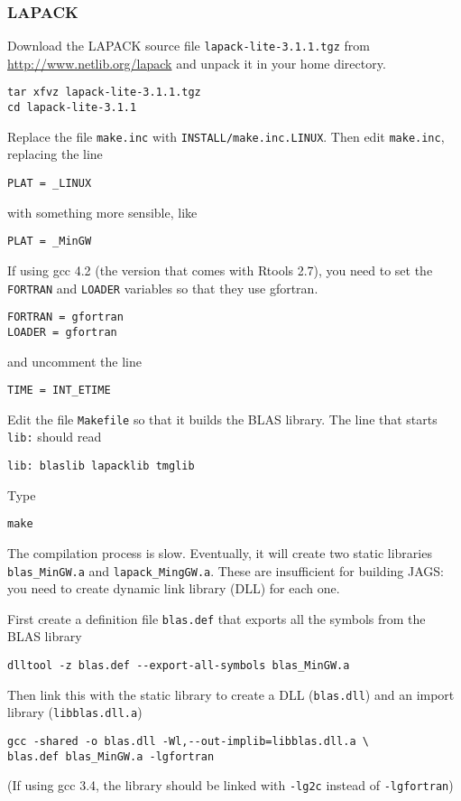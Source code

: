 \documentclass[11pt, a4paper, titlepage]{report}
\newcommand{\JAGS}{\textsf{JAGS}}
\begin{document}
\subsubsection*{LAPACK}

Download the LAPACK source file \verb+lapack-lite-3.1.1.tgz+ from
\url{http://www.netlib.org/lapack} and unpack it in your home
directory.
\begin{verbatim}
tar xfvz lapack-lite-3.1.1.tgz
cd lapack-lite-3.1.1
\end{verbatim}
Replace the file \texttt{make.inc} with
\texttt{INSTALL/make.inc.LINUX}.  Then edit \texttt{make.inc},
replacing the line
\begin{verbatim}
PLAT = _LINUX
\end{verbatim}
with something more sensible, like
\begin{verbatim}
PLAT = _MinGW
\end{verbatim} 
If using gcc 4.2 (the version that comes with Rtools 2.7), you need
to set the \verb+FORTRAN+ and \verb+LOADER+ variables so that they use
gfortran.
\begin{verbatim}
FORTRAN = gfortran
LOADER = gfortran
\end{verbatim}
and uncomment the line
\begin{verbatim}
TIME = INT_ETIME
\end{verbatim}

Edit the file \texttt{Makefile} so that it builds the BLAS library. The
line that starts \texttt{lib:} should read
\begin{verbatim}
lib: blaslib lapacklib tmglib
\end{verbatim}
Type
\begin{verbatim}
make 
\end{verbatim}
The compilation process is slow. Eventually, it will create two static
libraries \verb+blas_MinGW.a+ and \verb+lapack_MingGW.a+. These are
insufficient for building \JAGS: you need to create dynamic link
library (DLL) for each one.

First create a definition file \verb+blas.def+ that exports all the
symbols from the BLAS library
\begin{verbatim}
dlltool -z blas.def --export-all-symbols blas_MinGW.a
\end{verbatim}
Then link this with the static library to create a DLL
(\verb+blas.dll+) and an import library (\verb+libblas.dll.a+)
\begin{verbatim}
gcc -shared -o blas.dll -Wl,--out-implib=libblas.dll.a \
blas.def blas_MinGW.a -lgfortran
\end{verbatim}
(If using gcc 3.4, the library should be linked with \verb+-lg2c+ 
instead of \verb+-lgfortran+)
 
\end{document}
